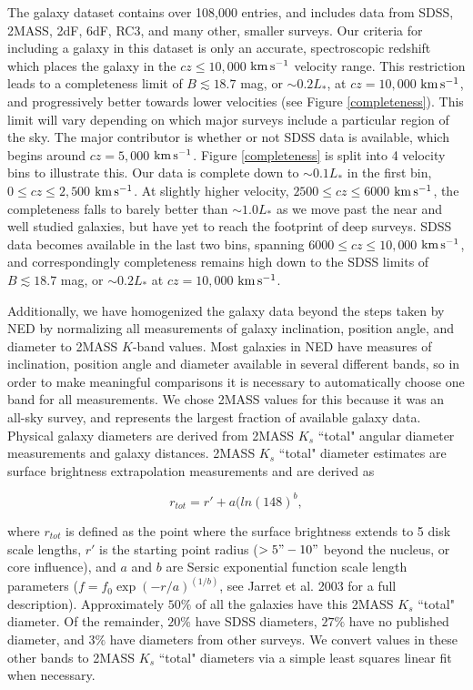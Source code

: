 \documentclass[twocolumn,tighten]{aastex6}
\begin{document}
The galaxy dataset contains over 108,000 entries, and includes data from SDSS, 2MASS, 2dF, 6dF, RC3, and many other, smaller surveys. Our criteria for including a galaxy in this dataset is only an accurate, spectroscopic redshift which places the galaxy in the $cz \leq 10,000$ $\rm km\, s^{-1}$ velocity range. This restriction leads to a completeness limit of $B \lesssim 18.7$ mag, or $\sim0.2 L_*$, at $cz = 10,000$ $\rm km\, s^{-1}$, and progressively better towards lower velocities (see Figure \ref{completeness}). This limit will vary depending on which major surveys include a particular region of the sky. The major contributor is whether or not SDSS data is available, which begins around $cz = 5,000$ $\rm km\, s^{-1}$. Figure \ref{completeness} is split into 4 velocity bins to illustrate this. Our data is complete down to $\sim0.1 L_*$ in the first bin, $0 \leq cz \leq 2,500$ $\rm km\, s^{-1}$. At slightly higher velocity, $2500 \leq cz \leq 6000$ $\rm km\, s^{-1}$, the completeness falls to barely better than $\sim1.0 L_*$ as we move past the near and well studied galaxies, but have yet to reach the footprint of deep surveys. SDSS data becomes available in the last two bins, spanning $6000 \leq cz \leq 10,000$ $\rm km\, s^{-1}$, and correspondingly completeness remains high down to the SDSS limits of $B \lesssim 18.7$ mag, or $\sim0.2 L_*$ at $cz = 10,000$ $\rm km\, s^{-1}$.

Additionally, we have homogenized the galaxy data beyond the steps taken by NED by normalizing all measurements of galaxy inclination, position angle, and diameter to 2MASS $K$-band values. Most galaxies in NED have measures of inclination, position angle and diameter available in several different bands, so in order to make meaningful comparisons it is necessary to automatically choose one band for all measurements. We chose 2MASS values for this because it was an all-sky survey, and represents the largest fraction of available galaxy data. Physical galaxy diameters are derived from 2MASS $K_s$ ``total" angular diameter measurements and galaxy distances. 2MASS $K_s$ ``total" diameter estimates are surface brightness extrapolation measurements and are derived as 

\begin{equation}
r_{tot} = r' + a(ln(148)^b,
\end{equation}

\noindent where $r_{tot}$ is defined as the point where the surface brightness extends to 5 disk scale lengths, $r'$ is the starting point radius ($>5" - 10"$ beyond the nucleus, or core influence), and $a$ and $b$ are Sersic exponential function scale length parameters ($f = f_0 \exp{(-r/a)}^{(1/b)}$, see Jarret et al. 2003 for a full description). Approximately $50\%$ of all the galaxies have this 2MASS $K_s$ ``total" diameter. Of the remainder, $20\%$ have SDSS diameters, $27\%$ have no published diameter, and $3\%$ have diameters from other surveys. We convert values in these other bands to 2MASS $K_s$ ``total" diameters via a simple least squares linear fit when necessary.
\end{document}
